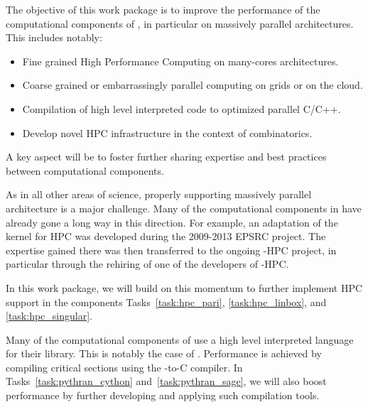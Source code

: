 \addtocounter{wpno}{1}
\begin{Workpackage}{\thewpno}
\label{wp:hpc}
\WPTitle{\wpname{\thewpno}}

\begin{WPObjectives}
  The objective of this work package is to improve the performance of
  the computational components of \TheProject, in particular on
  massively parallel architectures. This includes notably:
  \begin{itemize}
  \item Fine grained High Performance Computing on many-cores
    architectures.
  \item Coarse grained or embarrassingly parallel computing on grids
    or on the cloud.
  \item Compilation of high level interpreted code to optimized
    parallel C/C++.
  \item Develop novel HPC infrastructure in the context of
    combinatorics.
  \end{itemize}
  A key aspect will be to foster further sharing expertise and best
  practices between computational components.
\end{WPObjectives}

\begin{WPDescription}
  As in all other areas of science, properly supporting massively
  parallel architecture is a major challenge. Many of the
  computational components in \TheProject have already gone a long way
  in this direction. For example, an adaptation of the \GAP kernel for
  HPC was developed during the 2009-2013 EPSRC project. The expertise
  gained there was then transferred to the ongoing \Singular-HPC
  project, in particular through the rehiring of one of the developers
  of \GAP-HPC.

  In this work package, we will build on this momentum to further
  implement HPC support in the components Tasks~\ref{task:hpc_pari},
  \ref{task:hpc_linbox}, and \ref{task:hpc_singular}.


  Many of the computational components of \TheProject use a high level
  interpreted language for their library. This is notably the case of
  \Sage. Performance is achieved by compiling critical sections using
  the \Cython \Python-to-C compiler. In
  Tasks~\ref{task:pythran_cython} and~\ref{task:pythran_sage}, we will also
  boost performance by further developing and applying such
  compilation tools.
\end{WPDescription}


\end{Workpackage}

